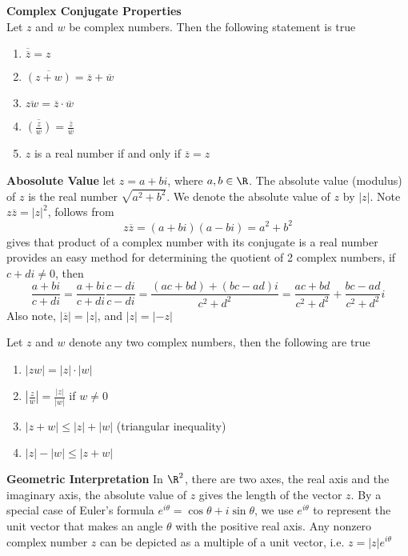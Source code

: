 \documentclass[11pt]{article}
\begin{document}
\begin{theorem*} \textbf{Complex Conjugate Properties} \\
    Let $z$ and $w$ be complex numbers. Then the following statement is true 
    \begin{enumerate}
        \item $\overline{\overline{z}} = z$
        \item $\overline{(z+w)} = \overline{z} + \overline{w}$
        \item $\overline{zw} = \overline{z}\cdot \overline{w}$
        \item $\overline{(\frac{z}{w})} = \frac{\overline{z}}{\overline{w}}$
        \item $z$ is a real number if and only if $\overline{z}=z$
    \end{enumerate}
\end{theorem*}

\begin{defn*}
    \textbf{Abosolute Value} let $z = a+bi$, where $a,b\in \R$. The absolute value (modulus) of $z$ is the real number $\sqrt{a^2 + b^2}$. We denote the absolute value of $z$ by $|z|$. Note $z\overline{z} = |z|^2$, follows from 
    \[
        z\overline{z} = (a+bi)(a-bi) = a^2 + b^2    
    \]
    gives that product of a complex number with its conjugate is a real number provides an easy method for determining the quotient of 2 complex numbers, if $c+di \neq 0$, then 
    \[
        \frac{a+bi}{c+di} 
        = \frac{a+bi}{c+di} \frac{c-di}{c-di}
        = \frac{(ac+bd) + (bc-ad)i}{c^2 + d^2}
        = \frac{ac+bd}{c^2+d^2} + \frac{bc-ad}{c^2+d^2}i
    \]
    Also note, $|\overline{z}| = |z|$, and $|z| = |-z|$
\end{defn*}


\begin{theorem*}
    Let $z$ and $w$ denote any two complex numbers, then the following are true 
    \begin{enumerate}
        \item $|zw| = |z|\cdot |w|$
        \item $|\frac{z}{w}| = \frac{|z|}{|w|}$ if $w\neq 0$
        \item $|z+w| \leq |z| + |w|$  (triangular inequality)
        \item $|z| - |w| \leq |z+w|$
    \end{enumerate}
\end{theorem*}


\begin{defn*}
    \textbf{Geometric Interpretation} In $\R^2$, there are two axes, the real axis and the imaginary axis, the absolute value of $z$ gives the length of the vector $z$. By a special case of Euler's formula $e^{i\theta} = \cos{\theta} + i\sin{\theta}$, we use $e^{i\theta}$ to represent the unit vector that makes an angle $\theta$ with the positive real axis. Any nonzero complex number $z$ can be depicted as a multiple of a unit vector, i.e. $z = |z|e^{i\theta}$
\end{defn*}
\end{document}

